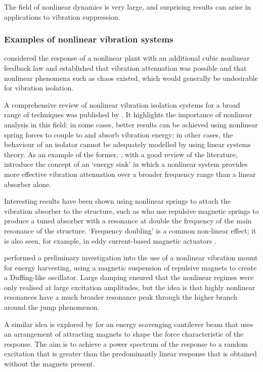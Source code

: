 \documentclass[11pt,a4paper]{memoir}
\begin{document}
The field of nonlinear dynamics is very large, and surprising results can arise in applications to vibration suppression.

\subsubsection{Examples of nonlinear vibration systems}

\textcite{oueini1999} considered the response of a nonlinear plant with an additional cubic nonlinear feedback law and established that vibration attenuation was possible and that nonlinear phenomena such as chaos existed, which would generally be undesirable for vibration isolation.

A comprehensive review of nonlinear vibration isolation systems for a broad range of techniques was published by \textcite{ibrahim2008}.
It highlights the importance of nonlinear analysis in this field: in some cases, better results can be achieved using nonlinear spring forces to couple to and absorb vibration energy; in other cases, the behaviour of an isolator cannot be adequately modelled by using linear systems theory.
As an example of the former, \textcite{starosvetsky2008}, with a good review of the literature, introduce the concept of an `energy sink' in which a nonlinear system provides more effective vibration attenuation over a broader frequency range than a linear absorber alone.

Interesting results have been shown using nonlinear springs to attach the vibration absorber to the structure, such as \textcite{jo2008} who use repulsive magnetic springs to produce a tuned absorber with a resonance at double the frequency of the main resonance of the structure.
`Frequency doubling' is a common non-linear effect; it is also seen, for example, in eddy current-based magnetic actuators \cite{sodano2008-dsmc}.

\textcite{mann2008} performed a preliminary investigation into the use of a nonlinear vibration mount for energy harvesting, using a magnetic suspension of repulsive magnets to create a Duffing-like oscillator.
Large damping ensured that the nonlinear regimes were only realised at large excitation amplitudes, but the idea is that highly nonlinear resonances have a much broader resonance peak through the higher branch around the jump phenomenon.

A similar idea is explored by \textcite{shahruz2008} for an energy scavenging cantilever beam that uses an arrangement of attracting magnets to shape the force characteristic of the response.
The aim is to achieve a power spectrum of the response to a random excitation that is greater than the predominantly linear response that is obtained without the magnets present.
\end{document}
